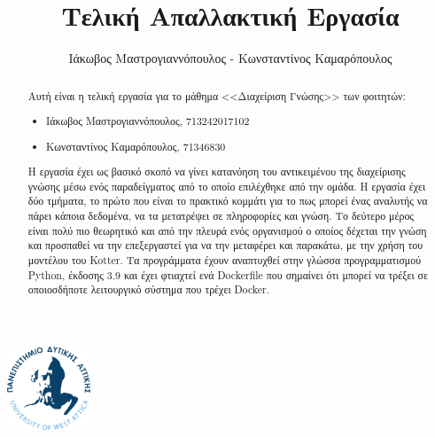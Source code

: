 \documentclass[
  11pt,
  singlespacing,
  liststotoc,
  toctotoc,
  headspline
]{fphw}
\title{Τελική Απαλλακτική Εργασία}
\author{Ιάκωβος Μαστρογιαννόπουλος - Κωνσταντίνος Καμαρόπουλος}
\institute{Πανεπιστημιο Δυτικης Αττικης \\ Τμημα Μηχανικων Πληροφορικης και Υπολογιστων}
\begin{document}
\includegraphics[width=25mm]{Figures/Logo}
\maketitle

\begin{abstract}
  Αυτή είναι η τελική εργασία για το μάθημα <<Διαχείριση Γνώσης>> των φοιτητών:
  \begin{itemize}
      \item Ιάκωβος Μαστρογιαννόπουλος, 713242017102
      \item Κωνσταντίνος Καμαρόπουλος, 71346830
  \end{itemize}

  Η εργασία έχει ως βασικό σκοπό να γίνει κατανόηση του αντικειμένου της διαχείρισης γνώσης μέσω ενός παραδείγματος από το οποίο επιλέχθηκε από την ομάδα. Η εργασία έχει δύο τμήματα, το πρώτο που είναι το πρακτικό κομμάτι για το πως μπορεί ένας αναλυτής να πάρει κάποια δεδομένα, να τα μετατρέψει σε πληροφορίες και γνώση. Το δεύτερο μέρος είναι πολύ πιο θεωρητικό και από την πλευρά ενός οργανισμού ο οποίος δέχεται την γνώση και προσπαθεί να την επεξεργαστεί για να την μεταφέρει και παρακάτω, με την χρήση του μοντέλου του Kotter. Τα προγράμματα έχουν αναπτυχθεί στην γλώσσα προγραμματισμού Python, έκδοσης 3.9 και έχει φτιαχτεί ενά Dockerfile που σημαίνει ότι μπορεί να τρέξει σε οποιοσδήποτε λειτουργικό σύστημα που τρέχει Docker.
\end{abstract}

\newpage
\tableofcontents
\listoffigures
\listoftables

\newpage



\appendix

\end{document}

